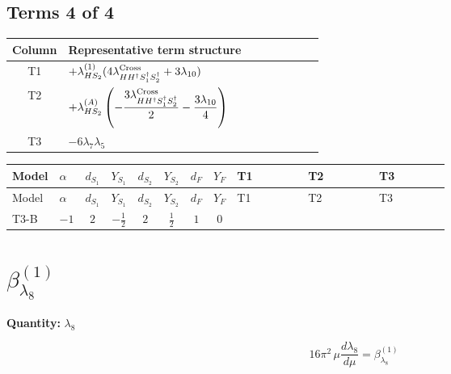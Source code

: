 \documentclass[8pt]{article}
\begin{document}
\begin{landscape}
\subsection*{Terms 4 of 4}
\begin{center}
\begin{tabular}{@{}c >{\raggedright\arraybackslash}p{0.82\linewidth}@{}}
\toprule
Column & Representative term structure \\
\midrule
T1 & \(\displaystyle +{\lambda_{HS_2}^{(1)}} (4 {\lambda_{H H^\dagger S_1^\dagger S_2^\dagger}^{\rm Cross}}+3 {\lambda_{10}})\) \\
\midrule
T2 & \(\displaystyle +{\lambda_{HS_2}^{(A)}} \left(-\frac{3 {\lambda_{H H^\dagger S_1^\dagger S_2^\dagger}^{\rm Cross}}}{2}-\frac{3 {\lambda_{10}}}{4}\right)\) \\
\midrule
T3 & \(\displaystyle -6 {\lambda_{7}} {\lambda_5}\) \\
\midrule
\bottomrule
\end{tabular}
\end{center}
\smallskip
\tiny
\begin{longtable}{@{}llcccccc >{\raggedright\arraybackslash}p{0.21\linewidth} >{\raggedright\arraybackslash}p{0.21\linewidth} >{\raggedright\arraybackslash}p{0.21\linewidth}@{}}
\toprule
Model & $\alpha$ & $d_{S_1}$ & $Y_{S_1}$ & $d_{S_2}$ & $Y_{S_2}$ & $d_F$ & $Y_F$ & T1 & T2 & T3 \\
\midrule
\endfirsthead
\toprule
Model & $\alpha$ & $d_{S_1}$ & $Y_{S_1}$ & $d_{S_2}$ & $Y_{S_2}$ & $d_F$ & $Y_F$ & T1 & T2 & T3 \\
\midrule
\endhead
T3-B & $-1$ & $2$ & $-\frac{1}{2}$ & $2$ & $\frac{1}{2}$ & $1$ & $0$ & \scriptsize\adjustbox{max width=\linewidth}{$\begin{gathered} +{\lambda_{HS_2}^{(1)}} (4 {\lambda_{H H^\dagger S_1^\dagger S_2^\dagger}^{\rm Cross}}+3 {\lambda_{10}})\end{gathered}$} & \scriptsize\adjustbox{max width=\linewidth}{$\begin{gathered} +{\lambda_{HS_2}^{(A)}} \left(-\frac{3 {\lambda_{H H^\dagger S_1^\dagger S_2^\dagger}^{\rm Cross}}}{2}-\frac{3 {\lambda_{10}}}{4}\right)\end{gathered}$} & \scriptsize\adjustbox{max width=\linewidth}{$\begin{gathered} -6 {\lambda_{7}} {\lambda_5}\end{gathered}$} \\
\midrule
\bottomrule
\end{longtable}
\clearpage
\section*{$\beta_{\lambda_{8}}^{(1)}$}
\noindent\textbf{Quantity: }$\lambda_{8}$\par\smallskip
\[16\pi^2\,\mu\frac{d \lambda_{8}}{d\mu}=\beta_{\lambda_{8}}^{(1)}\]

\end{landscape}
\end{document}
